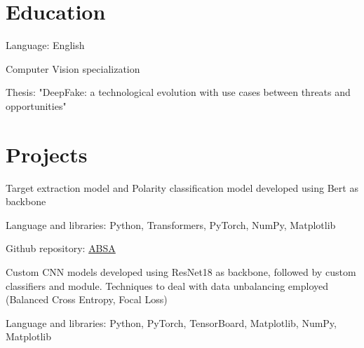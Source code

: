 \documentclass[]{plushcv}
\begin{document}
\begin{minipage}[t]{0.70\textwidth} 



\section{Education}
\vspace{\topsep} %
\begin{tightemize}
\sectionsep
\item Language: English
\item Computer Vision specialization
\end{tightemize}
\sectionsep

\begin{tightemize}
\sectionsep
\item Thesis: "DeepFake: a technological evolution with use cases between threats and opportunities"
\end{tightemize}
\sectionsep



\section{Projects}

\begin{tightemize}
\item Target extraction model and Polarity classification model developed using Bert as backbone
\item Language and libraries: Python, Transformers, PyTorch, NumPy, Matplotlib
\item Github repository: \href{https://github.com/SimoneCaldarella/ABSA_Project}{ABSA}
\end{tightemize}
\sectionsep

\begin{tightemize}
\item Custom CNN models developed using ResNet18 as backbone, followed by custom classifiers and module. Techniques to deal with data unbalancing employed (Balanced Cross Entropy, Focal Loss)
\item Language and libraries: Python, PyTorch, TensorBoard, Matplotlib, NumPy, Matplotlib
\end{tightemize}
\sectionsep


\end{minipage}
\end{document}
